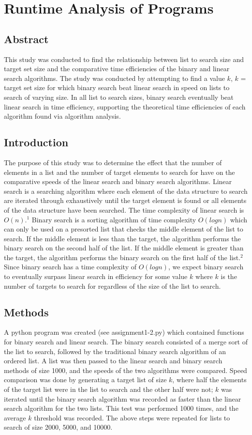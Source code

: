 \documentclass{article}
\begin{document}
	\newpage
	
	\section{Runtime Analysis of Programs}
	\subsection*{Abstract}
		This study was conducted to find the relationship between list to search size and target set size and the comparative time efficiencies of the binary and linear search algorithms. The study was conducted by attempting to find a value $k$, $k$ = target set size for which binary search beat linear search in speed on lists to search of varying size. In all list to search sizes, binary search eventually beat linear search in time efficiency, supporting the theoretical time efficiencies of each algorithm found via algorithm analysis.
	\subsection*{Introduction}
		The purpose of this study was to determine the effect that the number of elements in a list and the number of target elements to search for have on the comparative speeds of the linear search and binary search algorithms. Linear search is a searching algorithm where each element of the data structure to search are iterated through exhaustively until the target element is found or all elements of the data structure have been searched. The time complexity of linear search is $O(n)$.$^1$ Binary search is a sorting algorithm of time complexity $O(logn)$ which can only be used on a presorted list that checks the middle element of the list to search. If the middle element is less than the target, the algorithm performs the binary search on the second half of the list. If the middle element is greater than the target, the algorithm performs the binary search on the first half of the list.$^2$ Since binary search has a time complexity of $O(logn)$, we expect binary search to eventually surpass linear search in efficiency for some value $k$ where $k$ is the number of targets to search for regardless of the size of the list to search.
	\subsection*{Methods}
 		A python program was created (see assignment1-2.py) which contained functions for binary search and linear search. The binary search consisted of a merge sort of the list to search, followed by the traditional binary search algorithm of an ordered list. A list was then passed to the linear search and binary search methods of size 1000, and the speeds of the two algorithms were compared. Speed comparison was done by generating a target list of size $k$, where half the elements of the target list were in the list to search and the other half were not; $k$ was iterated until the binary search algorithm was recorded as faster than the linear search algorithm for the two lists. This test was performed 1000 times, and the average $k$ threshold was recorded. The above steps were repeated for lists to search of size 2000, 5000, and 10000.
 	\newpage
\end{document}
